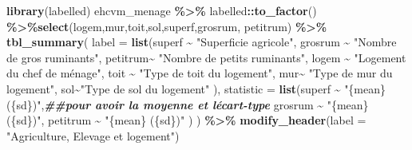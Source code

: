 \documentclass[
]{article}
\newenvironment{Shaded}{\begin{snugshade}}{\end{snugshade}}
\newcommand{\AttributeTok}[1]{\textcolor[rgb]{0.13,0.29,0.53}{#1}}
\newcommand{\DocumentationTok}[1]{\textcolor[rgb]{0.56,0.35,0.01}{\textbf{\textit{#1}}}}
\newcommand{\FunctionTok}[1]{\textcolor[rgb]{0.13,0.29,0.53}{\textbf{#1}}}
\newcommand{\NormalTok}[1]{#1}
\newcommand{\SpecialCharTok}[1]{\textcolor[rgb]{0.81,0.36,0.00}{\textbf{#1}}}
\newcommand{\StringTok}[1]{\textcolor[rgb]{0.31,0.60,0.02}{#1}}
\begin{document}
\begin{Shaded}
\begin{Highlighting}[]
\FunctionTok{library}\NormalTok{(labelled)}
\NormalTok{ehcvm\_menage }\SpecialCharTok{\%\textgreater{}\%}\NormalTok{ labelled}\SpecialCharTok{::}\FunctionTok{to\_factor}\NormalTok{() }\SpecialCharTok{\%\textgreater{}\%}\FunctionTok{select}\NormalTok{(logem,mur,toit,sol,superf,grosrum, petitrum) }\SpecialCharTok{\%\textgreater{}\%} \FunctionTok{tbl\_summary}\NormalTok{( }\AttributeTok{label =} \FunctionTok{list}\NormalTok{(superf }\SpecialCharTok{\textasciitilde{}} \StringTok{"Superficie agricole"}\NormalTok{,}
\NormalTok{ grosrum }\SpecialCharTok{\textasciitilde{}} \StringTok{"Nombre de gros ruminants"}\NormalTok{,}
\NormalTok{ petitrum}\SpecialCharTok{\textasciitilde{}} \StringTok{"Nombre de petits ruminants"}\NormalTok{,}
\NormalTok{ logem }\SpecialCharTok{\textasciitilde{}} \StringTok{"Logement du chef de ménage"}\NormalTok{,}
\NormalTok{ toit }\SpecialCharTok{\textasciitilde{}} \StringTok{"Type de toit du logement"}\NormalTok{,}
\NormalTok{ mur}\SpecialCharTok{\textasciitilde{}} \StringTok{"Type de mur du logement"}\NormalTok{,}
\NormalTok{ sol}\SpecialCharTok{\textasciitilde{}}\StringTok{"Type de sol du logement"}
\NormalTok{ ),}
 \AttributeTok{statistic =} \FunctionTok{list}\NormalTok{(superf }\SpecialCharTok{\textasciitilde{}} \StringTok{"\{mean\} (\{sd\})"}\NormalTok{,}\DocumentationTok{\#\#pour avoir la moyenne et l\textquotesingle{}écart{-}type}
\NormalTok{                  grosrum }\SpecialCharTok{\textasciitilde{}} \StringTok{"\{mean\} (\{sd\})"}\NormalTok{,}
\NormalTok{                  petitrum }\SpecialCharTok{\textasciitilde{}} \StringTok{"\{mean\} (\{sd\})"}
\NormalTok{                  )}
\NormalTok{ ) }\SpecialCharTok{\%\textgreater{}\%} \FunctionTok{modify\_header}\NormalTok{(}\AttributeTok{label =} \StringTok{"Agriculture, Elevage et logement"}\NormalTok{)}
\end{Highlighting}
\end{Shaded}
\end{document}
